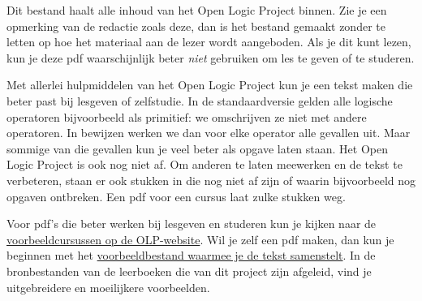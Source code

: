 \documentclass[../include/open-logic-part]{subfiles}
\begin{document}
\clearpage

\begin{editorial}
Dit bestand haalt alle inhoud van het Open Logic Project binnen. Zie je een
opmerking van de redactie zoals deze, dan is het bestand gemaakt zonder te
letten op hoe het materiaal aan de lezer wordt aangeboden. Als je dit kunt
lezen, kun je deze pdf waarschijnlijk beter \emph{niet} gebruiken om les te
geven of te studeren.

Met allerlei hulpmiddelen van het Open Logic Project kun je een tekst maken die
beter past bij lesgeven of zelfstudie. In de standaardversie gelden alle logische
operatoren bijvoorbeeld als primitief: we omschrijven ze niet met andere
operatoren. In bewijzen werken we dan voor elke operator alle gevallen uit.
Maar sommige van die gevallen kun je veel beter als opgave laten staan. Het Open
Logic Project is ook nog niet af. Om anderen te laten meewerken en de tekst te
verbeteren, staan er ook stukken in die nog niet af zijn of waarin bijvoorbeeld
nog opgaven ontbreken. Een pdf voor een cursus laat zulke
stukken weg.

Voor pdf's die beter werken bij lesgeven en studeren kun je kijken naar de
\href{http://builds.openlogicproject.org/}{voorbeeldcursussen op de
  OLP-website}. Wil je zelf een pdf maken, dan kun je beginnen met het
\href{https://github.com/OpenLogicProject/OpenLogic/tree/master/courses/sample}{voorbeeldbestand
  waarmee je de tekst samenstelt}. In de bronbestanden van de leerboeken die van
dit project zijn afgeleid, vind je uitgebreidere en moeilijkere voorbeelden.
\end{editorial}


















\end{document}

